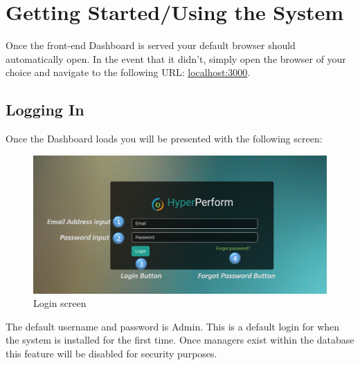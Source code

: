 \documentclass[11pt,a4paper]{article}
\begin{document}

%
%
\pagebreak
\section{Getting Started/Using the System}
Once the front-end Dashboard is served your default browser should automatically open. In the event that it didn't, simply open the browser of your choice and navigate to the following URL: \url{localhost:3000}. 

\subsection{Logging In}
Once the Dashboard loads you will be presented with the following screen:

\begin{figure}[H]
	\begin{center}
		\includegraphics[scale=0.3]{../Images/Getting_Started/Login_numbered}
		\caption{Login screen}
	\end{center}
\end{figure}
\noindent
The default username and password is Admin. This is a default login for when the system is installed for the first time. Once managers exist within the database this feature will be disabled for security purposes.
\end{document}
